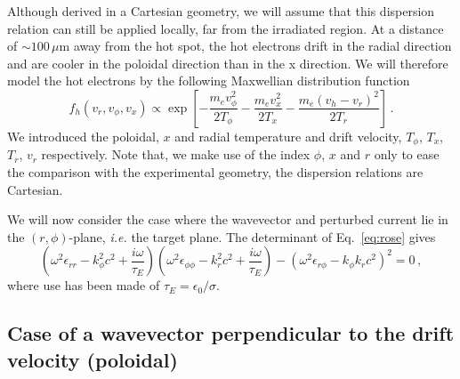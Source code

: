 \documentclass[aps,showpacs,superscriptaddress]{revtex4}
\begin{document}
Although  derived in a Cartesian geometry, we will assume that this dispersion relation can still be applied locally, far from the irradiated region. At a distance of $\sim 100\, \mu$m away from the hot spot, the hot electrons drift in the radial direction and are cooler in the poloidal direction than in the x direction. We will therefore model the hot electrons by the following Maxwellian distribution function 
\begin{equation}\label{eq:distrib}
f_h(v_r, v_\phi,v_x) \propto \exp\left[ -\frac{m_ev_\phi^2}{2T_\phi} -\frac{m_ev_x^2}{2T_x} -\frac{m_e(v_h-v_r)^2}{2T_r} \right]\, .
\end{equation}
We introduced the poloidal, $x$ and radial temperature and drift velocity, $T_\phi$, $T_x$, $T_r$, $v_r$ respectively. 
Note that, we make use of the index $\phi$, $x$ and $r$ only to ease the comparison with the experimental geometry, the dispersion relations are Cartesian.

We will now consider the case where the wavevector and perturbed current lie in the $(r,\phi)$-plane, \emph{i.e.} the target plane.
The determinant of Eq.~\eqref{eq:rose} gives
\begin{equation}\label{eq:dispe0}
\left(\omega^2 \epsilon_{rr} - k_\phi^2c^2 +\frac{i\omega}{\tau_E}\right)
\left(\omega^2 \epsilon_{\phi\phi} - k_r^2c^2 +\frac{i\omega}{\tau_E}\right)
-\left(\omega^2 \epsilon_{r\phi} - k_\phi k_rc^2\right)^2 = 0 \, ,
\end{equation}
where use has been made of $\tau_E = \epsilon_0/\sigma$.

\subsection{Case of a wavevector perpendicular to the drift velocity (poloidal)}
\end{document}
